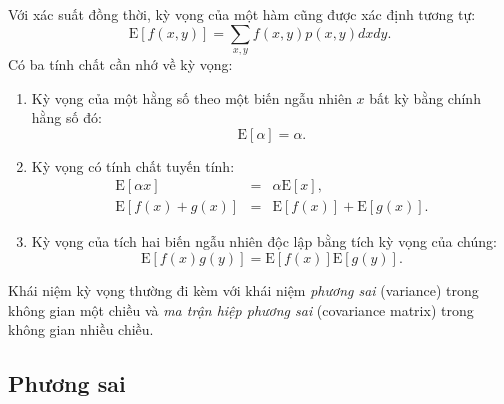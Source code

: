 Với xác suất đồng thời, kỳ vọng của một hàm cũng được xác định tương tự:
\begin{equation}
\label{eqn:30_24}
\text{E}[f(x, y)] = \sum_{x,y} f(x, y) p(x, y) dx dy.
\end{equation}
Có ba tính chất cần nhớ về kỳ vọng:
\begin{enumerate}
\item Kỳ vọng của một hằng số theo một biến ngẫu nhiên $x$ bất kỳ bằng chính hằng số đó:
\begin{equation}
\label{eqn:30_25}
\text{E}[\alpha] = \alpha.
\end{equation}
\item Kỳ vọng có tính chất tuyến tính:
\begin{eqnarray}
\label{eqn:30_26}
\text{E}[\alpha x] & = & \alpha \text{E}[x],  \\
\label{eqn:30_27}
\text{E}[f(x) + g(x)] & = & \text{E}[f(x)] + \text{E}[g(x)].
\end{eqnarray}
\item Kỳ vọng của tích hai biến ngẫu nhiên độc lập bằng tích kỳ vọng của chúng:
\begin{equation}
\label{eqn:30_28}
\text{E}[f(x) g(y)] = \text{E}[f(x)] \text{E}[g(y)].
\end{equation}

\end{enumerate}



Khái niệm kỳ vọng thường đi kèm với khái niệm \textit{phương
sai} (variance) trong không gian một chiều và \textit{ma trận hiệp
phương sai} (covariance matrix) trong không gian nhiều chiều.

\subsection{Phương sai} %

